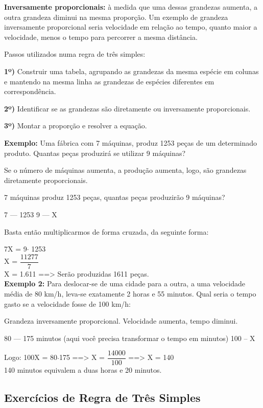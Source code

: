 \begin{multicols*}{2}
    \textbf{Inversamente proporcionais:} à medida que uma dessas grandezas aumenta, a outra grandeza diminui na mesma proporção. Um exemplo de grandeza inversamente proporcional seria velocidade em relação ao tempo, quanto maior a velocidade, menos o tempo para percorrer a mesma distância.

    Passos utilizados numa regra de três simples:

    \textbf{1º)} Construir uma tabela, agrupando as grandezas da mesma espécie em colunas e mantendo na mesma linha as grandezas de espécies diferentes em correspondência.

    \textbf{2º)} Identificar se as grandezas são diretamente ou inversamente proporcionais.

    \textbf{3º)} Montar a proporção e resolver a equação.

    \textbf{Exemplo:} Uma fábrica com 7 máquinas, produz 1253 peças de um determinado produto. Quantas peças produzirá se utilizar 9 máquinas?

    Se o número de máquinas aumenta, a produção aumenta, logo, são grandezas diretamente proporcionais.

    7 máquinas produz 1253 peças, quantas peças produzirão 9 máquinas?

    7  ---   1253
    9  ---      X

    Basta então multiplicarmos de forma cruzada, da seguinte forma:

    7X = 9$\cdot$ 1253  \\

    X = $\dfrac{11277}{7}$\\

    X = 1.611  ==> Serão produzidas 1611 peças.\\

    \textbf{Exemplo 2:} Para deslocar-se de uma cidade para a outra, a uma velocidade média de 80 km/h, leva-se exatamente 2 horas e 55 minutos. Qual seria o tempo gasto se a velocidade fosse de 100 km/h:

    Grandeza inversamente proporcional. Velocidade aumenta, tempo diminui.

    80  ---  175 minutos (aqui você precisa transformar o tempo em minutos)
    100 --    X

    Logo:   100X = 80$\cdot$175    ==>  X = $\dfrac{14000}{100}$    ==>   X = 140\\

    140 minutos equivalem a duas horas e 20 minutos.

    \subsection{Exercícios de Regra de Três Simples}


\end{multicols*}
